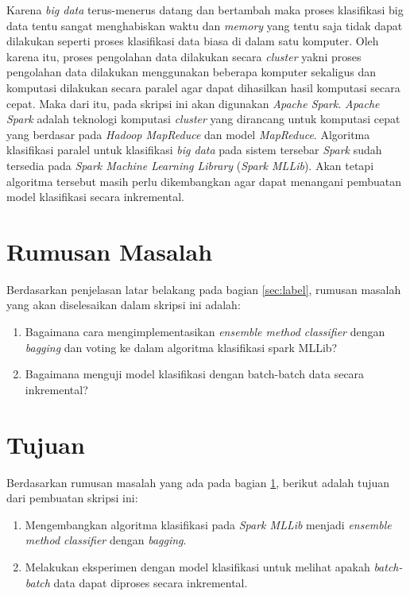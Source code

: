 Karena \textit{big data} terus-menerus datang dan bertambah maka proses klasifikasi big data tentu sangat menghabiskan waktu dan \textit{memory} yang tentu saja tidak dapat dilakukan seperti proses klasifikasi data biasa di dalam satu komputer. Oleh karena itu, proses pengolahan data dilakukan secara \textit{cluster} yakni proses pengolahan data dilakukan menggunakan beberapa komputer sekaligus dan komputasi dilakukan secara paralel agar dapat dihasilkan hasil komputasi secara cepat. Maka dari itu, pada skripsi ini akan digunakan \textit{Apache Spark}. \textit{Apache Spark} adalah teknologi komputasi \textit{cluster} yang dirancang untuk komputasi cepat yang berdasar pada \textit{Hadoop MapReduce}  dan model \textit{MapReduce}. Algoritma klasifikasi paralel untuk klasifikasi \textit{big data} pada sistem tersebar \textit{Spark} sudah tersedia pada \textit{Spark Machine Learning Library} (\textit{Spark MLLib}). Akan tetapi algoritma tersebut masih perlu dikembangkan agar dapat menangani pembuatan model klasifikasi secara inkremental.


\section{Rumusan Masalah}
\label{sec:rumusan}
Berdasarkan penjelasan latar belakang pada bagian \ref{sec:label}, rumusan masalah yang akan diselesaikan dalam skripsi ini adalah:

\begin{enumerate}
\item Bagaimana cara mengimplementasikan \textit{ensemble method classifier} dengan \textit{bagging} dan voting ke dalam algoritma klasifikasi spark MLLib?
\item Bagaimana menguji model klasifikasi dengan batch-batch data secara inkremental?
\end{enumerate}


\section{Tujuan}
\label{sec:tujuan}
Berdasarkan rumusan masalah yang ada pada bagian \ref{sec:rumusan}, berikut adalah tujuan dari pembuatan skripsi ini:
\begin{enumerate}
\item Mengembangkan algoritma klasifikasi pada \textit{Spark MLLib} menjadi \textit{ensemble method classifier} dengan \textit{bagging}.
\item Melakukan eksperimen dengan model klasifikasi untuk melihat apakah \textit{batch-batch} data dapat diproses secara inkremental.
\end{enumerate}


